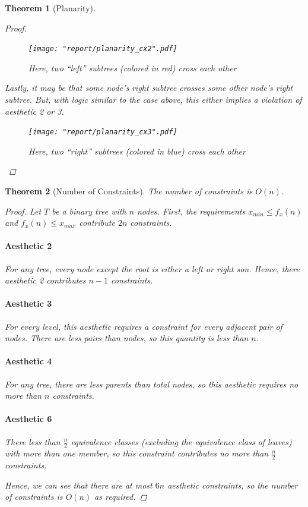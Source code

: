 \documentclass[11pt]{report}
\newtheorem{theorem}{Theorem}[section]
\begin{document}
\begin{theorem}[Planarity]
\begin{proof}
        \begin{figure}[H]
            \centering
            \texttt{[image: "report/planarity\_cx2".pdf]}
            \caption{Here, two ``left'' subtrees (colored in red) cross each other}
        \end{figure}
        
        Lastly, it may be that some node's right subtree crosses some other node's right subtree. But, with logic similar to the case above, this either implies a violation of aesthetic 2 or 3.
        
        \begin{figure}[H]
            \centering
            \texttt{[image: "report/planarity\_cx3".pdf]}
            \caption{Here, two ``right'' subtrees (colored in blue) cross each other}
        \end{figure}
    \end{proof}
\end{theorem}

\begin{theorem}[Number of Constraints]
    The number of constraints is $O(n)$.
    
    \begin{proof}
        Let $T$ be a binary tree with $n$ nodes. First, the requirements $x_{min} \leq f_x(n)$ and $f_x(n) \leq x_{max}$ contribute $2n$ constraints.
        
        \paragraph{Aesthetic 2} For any tree, every node except the root is either a left or right son. Hence, there aesthetic 2 contributes $n - 1$ constraints.
        
        \paragraph{Aesthetic 3} For every level, this aesthetic requires a constraint for every adjacent pair of nodes. There are less pairs than nodes, so this quantity is less than $n$.
        
        \paragraph{Aesthetic 4} For any tree, there are less parents than total nodes, so this aesthetic requires no more than $n$ constraints.
        
        \paragraph{Aesthetic 6} There less than $\frac{n}{2}$ equivalence classes (excluding the equivalence class of leaves) with more than one member, so this constraint contributes no more than $\frac{n}{2}$ constraints.
        
        \bigskip
        
        Hence, we can see that there are at most $6n$ aesthetic constraints, so the number of constraints is $O(n)$ as required.
    \end{proof}
\end{theorem}
\end{document}
